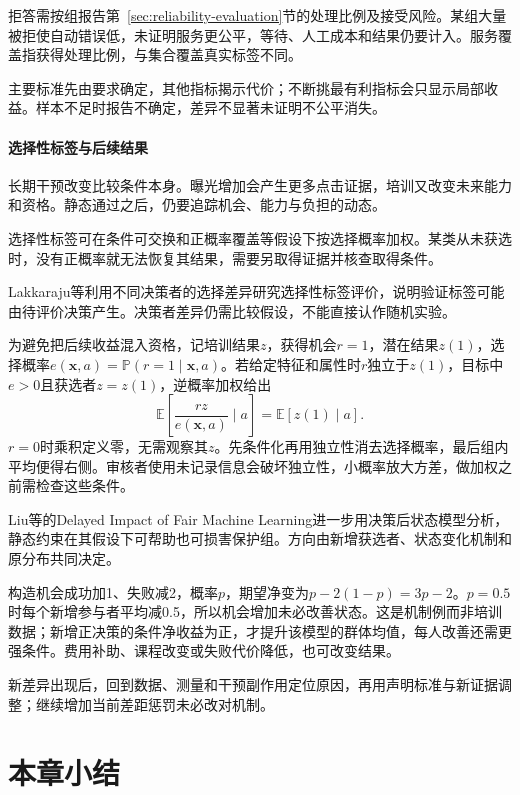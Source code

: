 拒答需按组报告第~\ref{sec:reliability-evaluation}节的处理比例及接受风险。某组大量被拒使自动错误低，未证明服务更公平，等待、人工成本和结果仍要计入。服务覆盖指获得处理比例，与集合覆盖真实标签不同。

主要标准先由要求确定，其他指标揭示代价；不断挑最有利指标会只显示局部收益。样本不足时报告不确定，差异不显著未证明不公平消失。

\paragraph{选择性标签与后续结果}

长期干预改变比较条件本身。曝光增加会产生更多点击证据，培训又改变未来能力和资格。静态通过之后，仍要追踪机会、能力与负担的动态。

选择性标签可在条件可交换和正概率覆盖等假设下按选择概率加权。某类从未获选时，没有正概率就无法恢复其结果，需要另取得证据并核查取得条件。

Lakkaraju等利用不同决策者的选择差异研究选择性标签评价，说明验证标签可能由待评价决策产生。决策者差异仍需比较假设，不能直接认作随机实验。

为避免把后续收益混入资格，记培训结果$z$，获得机会$r=1$，潜在结果$z(1)$，选择概率$e(\bm{x},a)=\mathbb P(r=1\mid\bm{x},a)$。若给定特征和属性时$r$独立于$z(1)$，目标中$e>0$且获选者$z=z(1)$，逆概率加权给出
\begin{equation}
 \mathbb E\!\left[\frac{r z}{e(\bm{x},a)}\mid a\right]
 =\mathbb E[z(1)\mid a].
 \label{eq:fairness-selective-weight}
\end{equation}
$r=0$时乘积定义零，无需观察其$z$。先条件化再用独立性消去选择概率，最后组内平均便得右侧。审核者使用未记录信息会破坏独立性，小概率放大方差，做加权之前需检查这些条件。

Liu等的Delayed Impact of Fair Machine Learning进一步用决策后状态模型分析，静态约束在其假设下可帮助也可损害保护组。方向由新增获选者、状态变化机制和原分布共同决定。

构造机会成功加1、失败减2，概率$p$，期望净变为$p-2(1-p)=3p-2$。$p=0.5$时每个新增参与者平均减0.5，所以机会增加未必改善状态。这是机制例而非培训数据；新增正决策的条件净收益为正，才提升该模型的群体均值，每人改善还需更强条件。费用补助、课程改变或失败代价降低，也可改变结果。

新差异出现后，回到数据、测量和干预副作用定位原因，再用声明标准与新证据调整；继续增加当前差距惩罚未必改对机制。

\section{本章小结}
\label{sec:fairness-summary}

